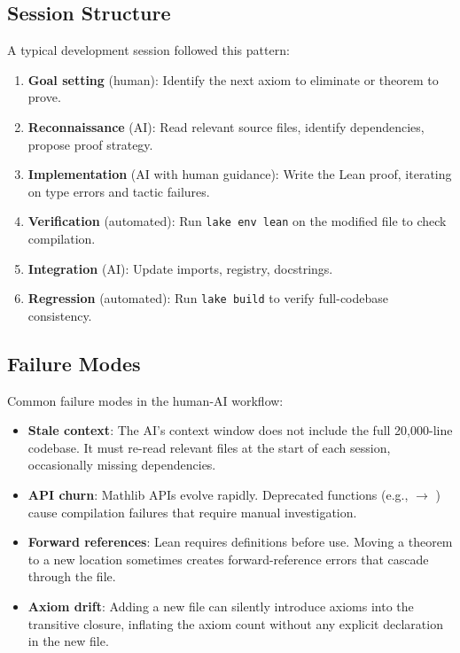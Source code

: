 \documentclass[11pt,a4paper]{article}
\begin{document}
\subsection{Session Structure}

A typical development session followed this pattern:

\begin{enumerate}
  \item \textbf{Goal setting} (human): Identify the next axiom to
    eliminate or theorem to prove.
  \item \textbf{Reconnaissance} (AI): Read relevant source files,
    identify dependencies, propose proof strategy.
  \item \textbf{Implementation} (AI with human guidance): Write the
    Lean proof, iterating on type errors and tactic failures.
  \item \textbf{Verification} (automated): Run \texttt{lake env lean}
    on the modified file to check compilation.
  \item \textbf{Integration} (AI): Update imports, registry, docstrings.
  \item \textbf{Regression} (automated): Run \texttt{lake build} to
    verify full-codebase consistency.
\end{enumerate}

\subsection{Failure Modes}

Common failure modes in the human-AI workflow:

\begin{itemize}
  \item \textbf{Stale context}: The AI's context window does not
    include the full 20,000-line codebase. It must re-read relevant
    files at the start of each session, occasionally missing
    dependencies.
  \item \textbf{API churn}: Mathlib APIs evolve rapidly.
    Deprecated functions (e.g.,  $\to$
    ) cause compilation failures that
    require manual investigation.
  \item \textbf{Forward references}: Lean requires definitions
    before use. Moving a theorem to a new location sometimes creates
    forward-reference errors that cascade through the file.
  \item \textbf{Axiom drift}: Adding a new file can silently introduce
    axioms into the transitive closure, inflating the axiom count
    without any explicit  declaration in the new file.
\end{itemize}
\end{document}
